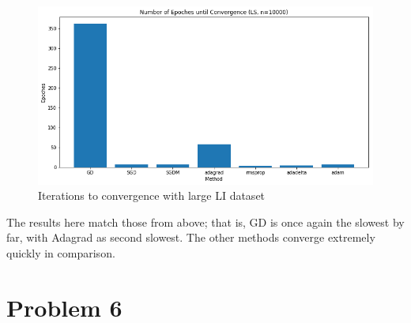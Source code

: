 \documentclass[twoside,11pt]{homework}
\begin{document}
\begin{figure}[H]
		\centering
		\includegraphics[scale=.5]{q5/insep_10000/time.png}	
		\caption{Iterations to convergence with large LI dataset}
	\end{figure}
	
The results here match those from above; that is, GD is once again the slowest by far, with Adagrad as second slowest. The other methods converge extremely quickly in comparison.

\section*{Problem 6}
\end{document}
